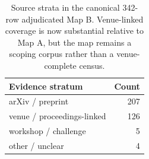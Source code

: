 \begin{table}[t]
\centering
\small
\begin{tabular}{lr}
\toprule
\textbf{Evidence stratum} & \textbf{Count} \\ 
\midrule
arXiv / preprint & 207 \\ 
venue / proceedings-linked & 126 \\ 
workshop / challenge & 5 \\ 
other / unclear & 4 \\ 
\bottomrule
\end{tabular}
\caption{Source strata in the canonical 342-row adjudicated Map B. Venue-linked coverage is now substantial relative to Map A, but the map remains a scoping corpus rather than a venue-complete census.}
\label{tab:evidence-strength}
\end{table}
